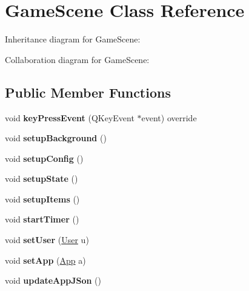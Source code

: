 \hypertarget{classGameScene}{}\section{Game\+Scene Class Reference}
\label{classGameScene}


Inheritance diagram for Game\+Scene\+:


Collaboration diagram for Game\+Scene\+:
\subsection*{Public Member Functions}
\begin{DoxyCompactItemize}
\item 
\mbox{\label{classGameScene_a32a9a3fea03221b8fbaaabb023f10620}} 
void {\bfseries key\+Press\+Event} (Q\+Key\+Event $\ast$event) override
\item 
\mbox{\label{classGameScene_aec7b74b7ecfb74157d8aea11489e2ad9}} 
void {\bfseries setup\+Background} ()
\item 
\mbox{\label{classGameScene_ad75dd3af78f7896ae5c5f3e3a0254faf}} 
void {\bfseries setup\+Config} ()
\item 
\mbox{\label{classGameScene_affa022fef2310973fd94cca45bd81026}} 
void {\bfseries setup\+State} ()
\item 
\mbox{\label{classGameScene_ace3b5e6356d6afccbc03c372ef42dcf7}} 
void {\bfseries setup\+Items} ()
\item 
\mbox{\label{classGameScene_ac6fba47edc47beef14d261309c34b91f}} 
void {\bfseries start\+Timer} ()
\item 
\mbox{\label{classGameScene_ae916cbb1661f27284cf8dc57a61a71cf}} 
void {\bfseries set\+User} (\hyperlink{classUser}{User} u)
\item 
\mbox{\label{classGameScene_a844dfe614a55baa81b50919254ca65a8}} 
void {\bfseries set\+App} (\hyperlink{classApp}{App} a)
\item 
\mbox{\label{classGameScene_a09ceabce78eced843f301240427949a3}} 
void {\bfseries update\+App\+J\+Son} ()
\end{DoxyCompactItemize}
